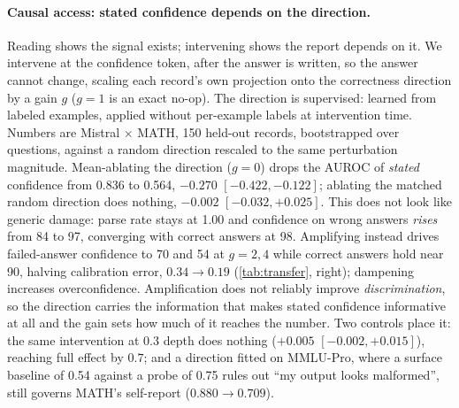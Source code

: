 \documentclass{article}
\begin{document}
\paragraph{Causal access: stated confidence depends on the direction.}
Reading shows the signal exists; intervening shows the report depends on it.
We intervene at the confidence token, after the answer is written, so the answer cannot change, scaling each record's own projection onto the correctness direction by a gain $g$ ($g{=}1$ is an exact no-op).
The direction is supervised: learned from labeled examples, applied without per-example labels at intervention time.
Numbers are Mistral $\times$ MATH, 150 held-out records, bootstrapped over questions, against a random direction rescaled to the same perturbation magnitude.
Mean-ablating the direction ($g{=}0$) drops the AUROC of \emph{stated} confidence from 0.836 to 0.564, $-0.270$ $[-0.422,-0.122]$; ablating the matched random direction does nothing, $-0.002$ $[-0.032,+0.025]$.
This does not look like generic damage: parse rate stays at 1.00 and confidence on wrong answers \emph{rises} from 84 to 97, converging with correct answers at 98.
Amplifying instead drives failed-answer confidence to 70 and 54 at $g{=}2,4$ while correct answers hold near 90, halving calibration error, $0.34\to0.19$ (\cref{tab:transfer}, right); dampening increases overconfidence.
Amplification does not reliably improve \emph{discrimination}, so the direction carries the information that makes stated confidence informative at all and the gain sets how much of it reaches the number.
Two controls place it: the same intervention at $0.3$ depth does nothing ($+0.005$ $[-0.002,+0.015]$), reaching full effect by $0.7$; and a direction fitted on MMLU-Pro, where a surface baseline of 0.54 against a probe of 0.75 rules out ``my output looks malformed'', still governs MATH's self-report ($0.880\to0.709$).
\end{document}
